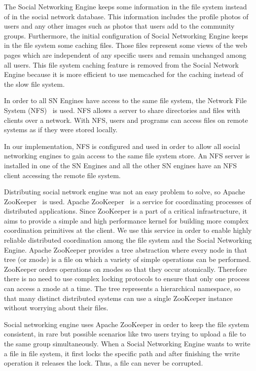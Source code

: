 The Social Networking Engine keeps some information in the file system instead of in the social network database. This information includes the profile photos of users and any other images such as photos that users add to the community groups. Furthermore, the initial configuration of Social Networking Engine keeps in the file system some caching files. Those files represent some views of the web pages which are independent of any specific users and remain unchanged among all users. This file system caching feature is removed from the Social Network Engine because it is more efficient to use memcached for the caching instead of the slow file system.

In order to all SN Engines have access to the same file system, the Network File System (NFS)~\cite{sahni2015network} is used. NFS allows a server to share directories and files with clients over a network. With NFS, users and programs can access files on remote systems as if they were stored locally.

In our implementation, NFS is configured and used in order to allow all social networking engines to gain access to the same file system store. An NFS server is installed in one of the SN Engines and all the other SN engines have an NFS client accessing the remote file system.   

Distributing social network engine was not an easy problem to solve, so Apache ZooKeeper~\cite{zookeeper_url} is used. 
Apache ZooKeeper~\cite{hunt2010zookeeper} is a service for coordinating processes of distributed applications. Since
ZooKeeper is a part of a critical infrastructure, it aims to provide a simple and high performance kernel
for building more complex coordination primitives at the client. 
We use this service in order to enable highly reliable distributed coordination among the file system and the Social Networking Engine. 
Apache ZooKeeper provides a tree abstraction where every node in that tree (or znode) is a file on which a variety of simple operations can be performed. ZooKeeper orders operations on znodes so that they occur atomically. Therefore there is no need to use complex locking protocols to ensure that only one process can access a znode at a time. The tree represents a hierarchical namespace, so that many distinct distributed systems can use a single ZooKeeper instance without worrying about their files. 

Social networking engine uses Apache ZooKeeper in order to keep the file system consistent, in rare but possible scenarios like two users trying to upload a file to the same group simultaneously. When a Social Networking Engine wants to write a file in file system, it first locks the specific path and after finishing the write operation it releases the lock. Thus, a file can never be corrupted.

